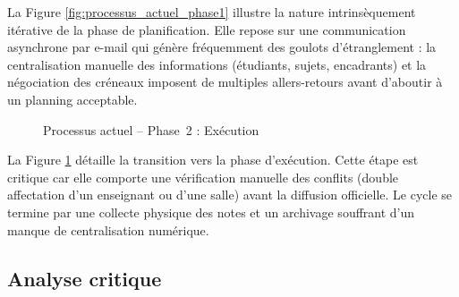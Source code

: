 \documentclass[12pt,a4paper]{article}
\begin{document}
La Figure \ref{fig:processus_actuel_phase1} illustre la nature intrinsèquement
itérative de la phase de planification. Elle repose sur une communication
asynchrone par e-mail qui génère fréquemment des goulots d'étranglement : la
centralisation manuelle des informations (étudiants, sujets, encadrants) et la
négociation des créneaux imposent de multiples allers-retours avant d'aboutir à
un planning acceptable.

\begin{figure}[H]
    \centering
    \caption{Processus actuel -- Phase~2 : Exécution}
    \label{fig:processus_actuel_phase2}
\end{figure}


La Figure \ref{fig:processus_actuel_phase2} détaille la transition vers la phase
d'exécution. Cette étape est critique car elle comporte une vérification
manuelle des conflits (double affectation d'un enseignant ou d'une salle) avant
la diffusion officielle. Le cycle se termine par une collecte physique des notes
et un archivage souffrant d'un manque de centralisation numérique.

\subsection{Analyse critique}
\label{subsec:analyse_critique}
\end{document}
